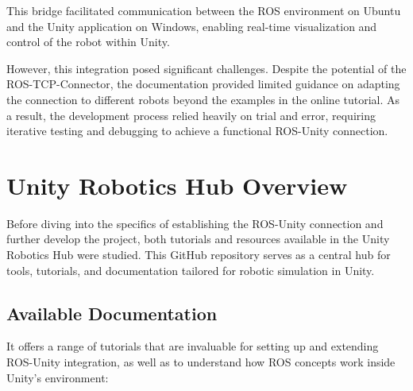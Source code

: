     This bridge facilitated communication between the ROS environment on Ubuntu and the Unity application on Windows, enabling real-time visualization 
    and control of the robot within Unity.

    However, this integration posed significant challenges. Despite the potential of the ROS-TCP-Connector, the documentation provided limited guidance 
    on adapting the connection to different robots beyond the examples in the online tutorial. As a result, the development process relied heavily on 
    trial and error, requiring iterative testing and debugging to achieve a functional ROS-Unity connection.

\section{Unity Robotics Hub Overview}

    Before diving into the specifics of establishing the ROS-Unity connection and further develop the project, both tutorials and resources available 
    in the Unity Robotics Hub were studied. This GitHub repository serves as a central hub for tools, tutorials, and documentation tailored for robotic 
    simulation in Unity.

    \subsection{Available Documentation}

    It offers a range of tutorials that are invaluable for setting up and extending ROS-Unity integration, as well as to understand how ROS concepts work inside Unity's environment:
    
